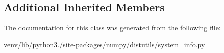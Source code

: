 \subsection*{Additional Inherited Members}


The documentation for this class was generated from the following file\+:\begin{DoxyCompactItemize}
\item 
venv/lib/python3./site-\/packages/numpy/distutils/\hyperlink{system__info_8py}{system\+\_\+info.\+py}\end{DoxyCompactItemize}

